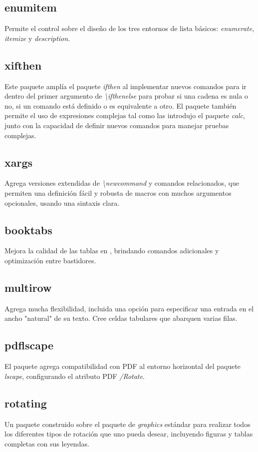\documentclass[12pt]{article}
\begin{document}
\subsection{enumitem}
Permite el control sobre el diseño de los tres entornos de lista básicos: \textit{enumerate}, \textit{itemize} y \textit{description}.\cite{enumitem}
\subsection{xifthen}
Este paquete amplía el paquete \textit{ifthen} al implementar nuevos comandos para ir dentro del primer argumento de \textit{\textbackslash ifthenelse} para probar si una cadena es nula o no, si un comando está definido o es equivalente a otro. El paquete también permite el uso de expresiones complejas tal como las introdujo el paquete \textit{calc}, junto con la capacidad de definir nuevos comandos para manejar pruebas complejas.\cite{xifthen}
\subsection{xargs}
Agrega versiones extendidas de \textit{\textbackslash newcommand} y comandos  relacionados, que permiten una definición fácil y robusta de macros con muchos argumentos opcionales, usando una sintaxis clara.\cite{xargs}
\subsection{booktabs}
Mejora la calidad de las tablas en , brindando comandos adicionales y optimización entre bastidores.\cite{booktabs}
\subsection{multirow}
Agrega mucha flexibilidad, incluida una opción para especificar una entrada en el ancho "natural" de su texto. Cree celdas tabulares que abarquen varias filas.\cite{multirow}
\subsection{pdflscape}
El paquete agrega compatibilidad con PDF al entorno horizontal del paquete \textit{lscape}, configurando el atributo PDF \textit{/Rotate}.\cite{pdflscape}
\subsection{rotating}
Un paquete construido sobre el paquete de  \textit{graphics} estándar para realizar todos los diferentes tipos de rotación que uno pueda desear, incluyendo figuras y tablas completas con sus leyendas.\cite{rotating}
\end{document}
